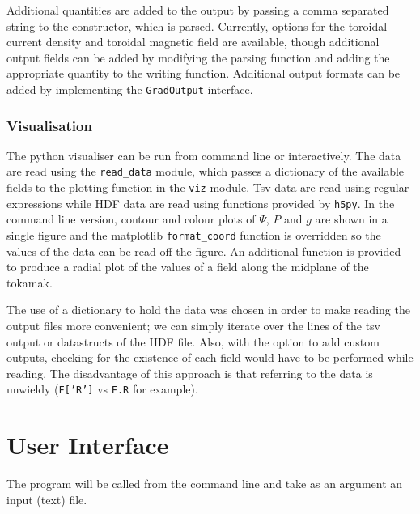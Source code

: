 \documentclass[paper=letter, fontsize=11pt]{scrartcl} %
\begin{document}
Additional quantities are added to the output by passing a comma separated string to the constructor, which is parsed. Currently, options for the toroidal current density and toroidal magnetic field are available, though additional output fields can be added by modifying the parsing function and adding the appropriate quantity to the writing function. Additional output formats can be added by implementing the \texttt{GradOutput} interface.

\subsubsection{Visualisation}

The python visualiser can be run from command line or interactively. The data are read using the \texttt{read\_data} module, which passes a dictionary of the available fields to the plotting function in the \texttt{viz} module. Tsv data are read using regular expressions while HDF data are read using functions provided by \texttt{h5py}. In the command line version, contour and colour plots of $\Psi$, $P$ and $g$ are shown in a single figure and the matplotlib \texttt{format\_coord} function is overridden so the values of the data can be read off the figure. An additional function is provided to produce a radial plot of the values of a field along the midplane of the tokamak. 

The use of a dictionary to hold the data was chosen in order to make reading the output files more convenient; we can simply iterate over the lines of the tsv output or datastructs of the HDF file. Also, with the option to add custom outputs, checking for the existence of each field would have to be performed while reading. The disadvantage of this approach is that referring to the data is unwieldy (\texttt{F['R']} vs \texttt{F.R} for example). 


\section{User Interface}

The program will be called from the command line and take as an argument an input (text) file. 
\end{document}

